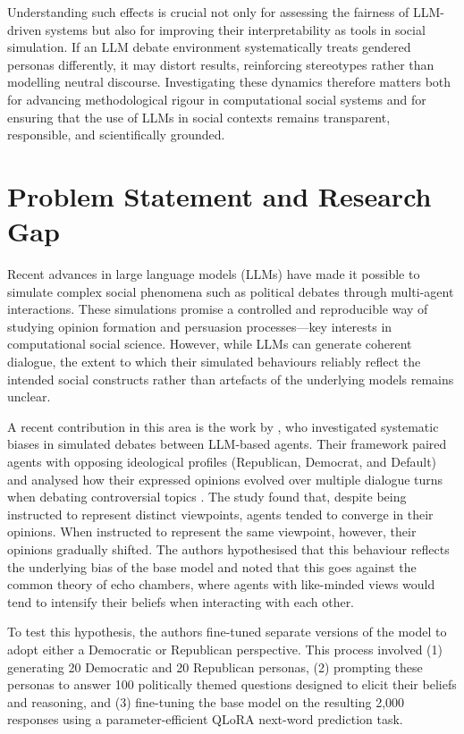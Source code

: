 Understanding such effects is crucial not only for assessing the fairness of LLM-driven systems but also for improving their interpretability as tools in social simulation. If an LLM debate environment systematically treats gendered personas differently, it may distort results, reinforcing stereotypes rather than modelling neutral discourse. Investigating these dynamics therefore matters both for advancing methodological rigour in computational social systems and for ensuring that the use of LLMs in social contexts remains transparent, responsible, and scientifically grounded.


\section{Problem Statement and Research Gap}

Recent advances in large language models (LLMs) have made it possible to simulate complex social phenomena such as political debates through multi-agent interactions. These simulations promise a controlled and reproducible way of studying opinion formation and persuasion processes—key interests in computational social science. However, while LLMs can generate coherent dialogue, the extent to which their simulated behaviours reliably reflect the intended social constructs rather than artefacts of the underlying models remains unclear.

A recent contribution in this area is the work by \citet{taubenfeld_systematic_2024}, who investigated systematic biases in simulated debates between LLM-based agents. Their framework paired agents with opposing ideological profiles (Republican, Democrat, and Default) and analysed how their expressed opinions evolved over multiple dialogue turns when debating controversial topics . The study found that, despite being instructed to represent distinct viewpoints, agents tended to converge in their opinions. When instructed to represent the same viewpoint, however, their opinions gradually shifted. The authors hypothesised that this behaviour reflects the underlying bias of the base model and noted that this goes against the common theory of echo chambers, where agents with like-minded views would tend to intensify their beliefs when interacting with each other.

To test this hypothesis, the authors fine-tuned separate versions of the model to adopt either a Democratic or Republican perspective. This process involved (1) generating 20 Democratic and 20 Republican personas, (2) prompting these personas to answer 100 politically themed questions designed to elicit their beliefs and reasoning, and (3) fine-tuning the base model on the resulting 2,000 responses using a parameter-efficient QLoRA next-word prediction task.

